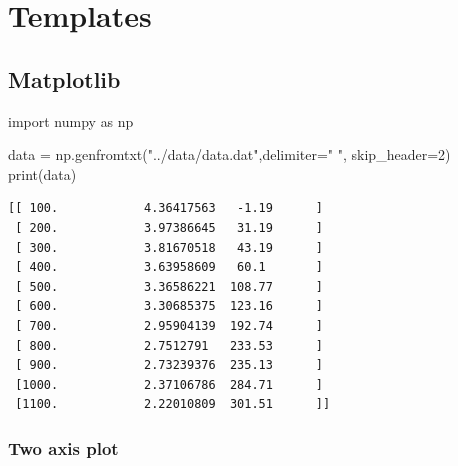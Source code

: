 \documentclass[
  letterpaper,
  DIV=11,
  numbers=noendperiod]{scrreprt}
\newenvironment{Shaded}{\begin{snugshade}}{\end{snugshade}}
\newcommand{\BuiltInTok}[1]{\textcolor[rgb]{0.00,0.23,0.31}{#1}}
\newcommand{\DecValTok}[1]{\textcolor[rgb]{0.68,0.00,0.00}{#1}}
\newcommand{\ImportTok}[1]{\textcolor[rgb]{0.00,0.46,0.62}{#1}}
\newcommand{\NormalTok}[1]{\textcolor[rgb]{0.00,0.23,0.31}{#1}}
\newcommand{\OperatorTok}[1]{\textcolor[rgb]{0.37,0.37,0.37}{#1}}
\newcommand{\StringTok}[1]{\textcolor[rgb]{0.13,0.47,0.30}{#1}}
\begin{document}
\part{Templates}

\hypertarget{matplotlib}{%
\chapter{Matplotlib}\label{matplotlib}}

\begin{Shaded}
\begin{Highlighting}[]
\ImportTok{import}\NormalTok{ numpy }\ImportTok{as}\NormalTok{ np}

\NormalTok{data }\OperatorTok{=}\NormalTok{ np.genfromtxt(}\StringTok{"../data/data.dat"}\NormalTok{,delimiter}\OperatorTok{=}\StringTok{"   "}\NormalTok{, skip\_header}\OperatorTok{=}\DecValTok{2}\NormalTok{)}
\BuiltInTok{print}\NormalTok{(data)}
\end{Highlighting}
\end{Shaded}

\begin{verbatim}
[[ 100.            4.36417563   -1.19      ]
 [ 200.            3.97386645   31.19      ]
 [ 300.            3.81670518   43.19      ]
 [ 400.            3.63958609   60.1       ]
 [ 500.            3.36586221  108.77      ]
 [ 600.            3.30685375  123.16      ]
 [ 700.            2.95904139  192.74      ]
 [ 800.            2.7512791   233.53      ]
 [ 900.            2.73239376  235.13      ]
 [1000.            2.37106786  284.71      ]
 [1100.            2.22010809  301.51      ]]
\end{verbatim}

\hypertarget{two-axis-plot}{%
\section*{Two axis plot}\label{two-axis-plot}}

\end{document}
